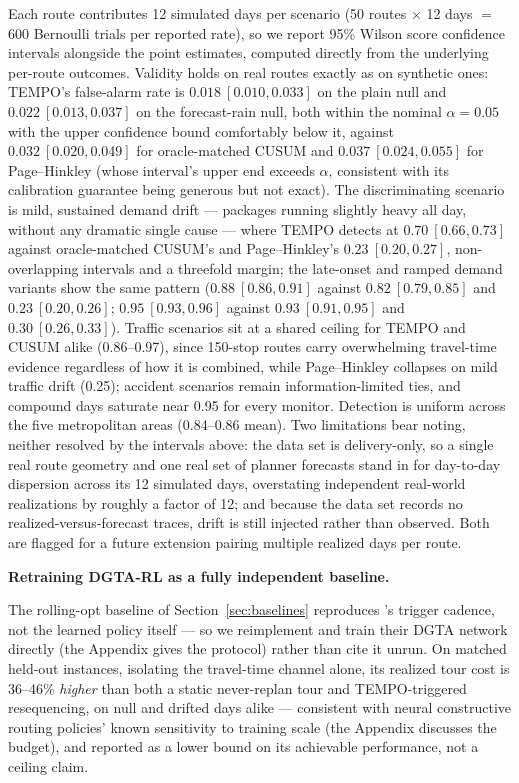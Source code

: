 \documentclass[trsc,dblanonrev]{informs4}
\begin{document}
Each route contributes 12 simulated days per scenario (50 routes
$\times$ 12 days $=$ 600 Bernoulli trials per reported rate), so we
report 95\% Wilson score confidence intervals alongside the point
estimates, computed directly from the underlying per-route outcomes.
Validity holds on real routes exactly as on synthetic ones: TEMPO's
false-alarm rate is $0.018\ [0.010, 0.033]$ on the plain null and
$0.022\ [0.013, 0.037]$ on the forecast-rain null, both within the
nominal $\alpha = 0.05$ with the upper confidence bound comfortably
below it, against $0.032\ [0.020, 0.049]$ for oracle-matched CUSUM and
$0.037\ [0.024, 0.055]$ for Page--Hinkley (whose interval's upper end
exceeds $\alpha$, consistent with its calibration guarantee being
generous but not exact). The discriminating scenario is mild,
sustained demand drift --- packages running slightly heavy all day,
without any dramatic single cause --- where TEMPO detects at $0.70\
[0.66, 0.73]$ against oracle-matched CUSUM's and Page--Hinkley's
$0.23\ [0.20, 0.27]$, non-overlapping intervals and a threefold margin;
the late-onset and ramped demand variants show the same pattern
($0.88\ [0.86, 0.91]$ against $0.82\ [0.79, 0.85]$ and $0.23\ [0.20,
0.26]$; $0.95\ [0.93, 0.96]$ against $0.93\ [0.91, 0.95]$ and $0.30\
[0.26, 0.33]$). Traffic scenarios sit at a shared ceiling for TEMPO and
CUSUM alike (0.86--0.97), since 150-stop routes carry overwhelming
travel-time evidence regardless of how it is combined, while
Page--Hinkley collapses on mild traffic drift (0.25); accident
scenarios remain information-limited ties, and compound days saturate
near 0.95 for every monitor. Detection is uniform across the five
metropolitan areas (0.84--0.86 mean). Two limitations bear noting,
neither resolved by the intervals above: the data set is
delivery-only, so a single real route geometry and one real set of
planner forecasts stand in for day-to-day dispersion across its 12
simulated days, overstating independent real-world realizations by
roughly a factor of 12; and because the data set records no
realized-versus-forecast traces, drift is still injected rather than
observed. Both are flagged for a future extension pairing multiple
realized days per route.

\textbf{Retraining DGTA-RL as a fully independent baseline.}\label{sec:dgta}

The rolling-opt baseline of Section~\ref{sec:baselines} reproduces
\citet{chen2025dgta}'s trigger cadence, not the learned policy itself
--- so we reimplement and train their DGTA network directly (the
Appendix gives the protocol) rather than cite it unrun. On matched
held-out instances, isolating the travel-time channel alone, its
realized tour cost is 36--46\% \emph{higher} than both a static
never-replan tour and TEMPO-triggered resequencing, on null and
drifted days alike --- consistent with neural constructive routing
policies' known sensitivity to training scale (the Appendix discusses
the budget), and reported as a lower bound on its achievable
performance, not a ceiling claim.
\end{document}
